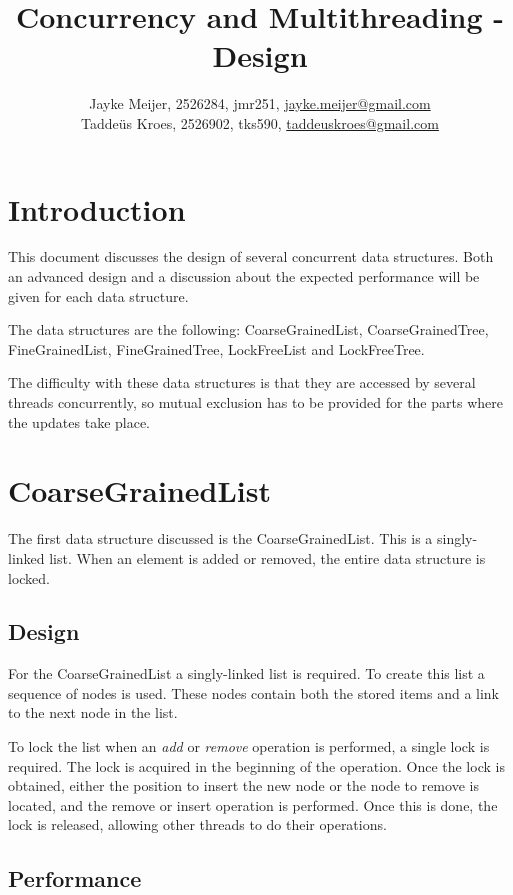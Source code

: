 \documentclass[a4paper]{article}
\title{Concurrency and Multithreading - Design}
\author{Jayke Meijer, 2526284, jmr251, \url{jayke.meijer@gmail.com} \\
Taddeüs Kroes, 2526902, tks590, \url{taddeuskroes@gmail.com}}
\begin{document}
\maketitle

\tableofcontents
\pagebreak

\section{Introduction}

This document discusses the design of several concurrent data
structures. Both an advanced design and a discussion about the
expected performance will be given for each data structure.

The data structures are the following: CoarseGrainedList,
CoarseGrainedTree, FineGrainedList, FineGrainedTree,
LockFreeList and LockFreeTree.

The difficulty with these data structures is that they are
accessed by several threads concurrently, so mutual exclusion has
to be provided for the parts where the updates take place.

\section{CoarseGrainedList}

The first data structure discussed is the CoarseGrainedList.
This is a singly-linked list. When an element is added or removed,
the entire data structure is locked.

\subsection{Design}

For the CoarseGrainedList a singly-linked list is required. To create this
list a sequence of nodes is used. These nodes contain both the stored items
and a link to the next node in the list.

To lock the list when an \emph{add} or \emph{remove} operation is performed,
a single lock is required. The lock is acquired in the beginning of the
operation. Once the lock is obtained, either the position to insert the new
node or the node to remove is located, and the remove or insert operation is
performed. Once this is done, the lock is released, allowing
other threads to do their operations.

\subsection{Performance}
\end{document}
